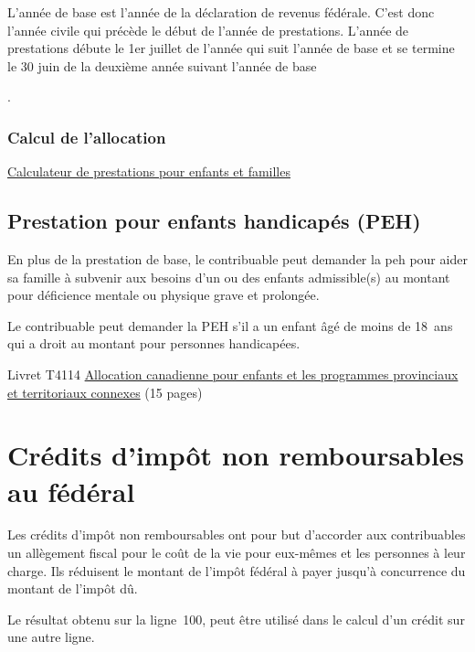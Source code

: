 \begin{rappel}
	L'année de base est l'année de la déclaration de revenus fédérale. C'est donc l'année civile qui précède le début de l'année de prestations. L'année de prestations débute le 1er juillet de l'année qui suit l'année de base et se termine le 30 juin de la deuxième année suivant l'année de base
\end{rappel}.

\subsubsection{Calcul de l'allocation}
\cat\href{https://www.canada.ca/fr/agence-revenu/services/prestations-enfants-familles/calculateur-prestations-enfants-familles.html}{Calculateur de prestations pour enfants et familles}


\subsection{Prestation pour enfants handicapés (PEH)}
En plus de la prestation de base, le contribuable peut demander la \acrfull{peh} pour aider sa famille à subvenir aux besoins d'un ou des enfants admissible(s) au montant pour déficience mentale ou physique grave et prolongée.

Le contribuable peut demander la PEH s'il a un enfant âgé de moins de 18~ans qui a droit au montant pour personnes handicapées. 

\cat
Livret T4114 \href{https://www.canada.ca/fr/agence-revenu/services/formulaires-publications/publications/t4114.html}{Allocation canadienne pour enfants et les programmes provinciaux et territoriaux connexes} (15 pages)



\section{Crédits d'impôt non remboursables au fédéral}
\begin{intro}
	Les crédits d'impôt non remboursables ont pour but d'accorder aux contribuables un allègement fiscal pour le coût de la vie pour eux-mêmes et les personnes à leur charge. Ils réduisent le montant de l'impôt fédéral à payer jusqu'à concurrence du montant de l'impôt dû.
\end{intro}

Le résultat obtenu sur la ligne~100, peut être utilisé dans le calcul d'un crédit sur une autre ligne.

